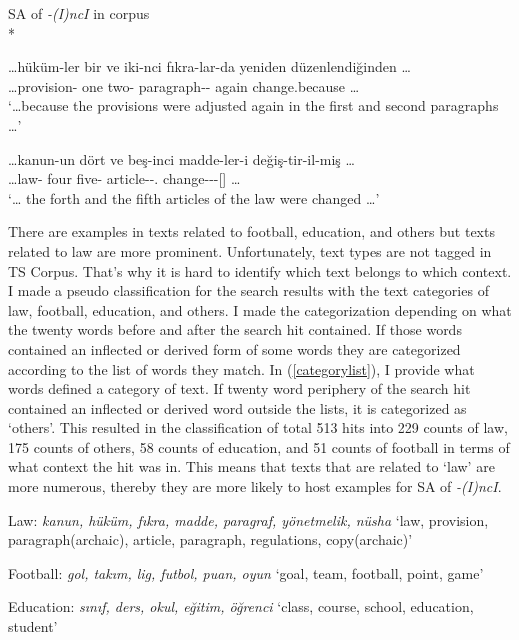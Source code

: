 \begin{exe}
\ex SA of \textit{-(I)ncI} in corpus\\*
\label{corpusquerry}
\begin{xlist}

\ex \gll \ldots hüküm-ler bir ve iki-nci fıkra-lar-da yeniden düzenlendiğinden \ldots \\
\ldots provision-{\Pl} one {\And} two-{\Der} paragraph-{\Pl}-{\Loc} again change.because \ldots \\
\glt `\ldots because the provisions were adjusted again in the first and second paragraphs \ldots'

\ex \gll \ldots kanun-un dört ve beş-inci madde-ler-i değiş-tir-il-miş \ldots \\
\ldots law-{\Gen} four {\And} five-{\Der} article-{\Pl}-{\Poss}.{\Tsg} change-{\Caus}-{\Pass}-{\Prf}[{\Tsg}] \ldots \\
\glt`{\ldots} the forth and the fifth articles of the law were changed {\ldots}'

\end{xlist}
\end{exe}

There are examples in texts related to football, education, and others but texts related to law are more prominent. Unfortunately, text types are not tagged in TS Corpus. That's why it is hard to identify which text belongs to which context. I made a pseudo classification for the search results with the text categories of law, football, education, and others. I made the categorization depending on what the twenty words before and after the search hit contained. If those words contained an inflected or derived form of some words they are categorized according to the list of words they match. In (\ref{categorylist}), I provide what words defined a category of text. If twenty word periphery of the search hit contained an inflected or derived word outside the lists, it is categorized as `others'. This resulted in the classification of total 513 hits into 229 counts of law, 175 counts of others, 58 counts of education, and 51 counts of football in terms of what context the hit was in. This means that texts that are related to `law' are more numerous, thereby they are more likely to host examples for SA of \textit{-(I)ncI}.

\begin{exe}
\ex \label{categorylist}
\begin{xlist}
\ex Law: \textit{kanun, hüküm, fıkra, madde, paragraf, yönetmelik, nüsha}
\glt `law, provision, paragraph(archaic), article, paragraph, regulations, copy(archaic)'

\ex Football: \textit{gol, takım, lig, futbol, puan, oyun}
\glt `goal, team, football, point, game'

\ex Education: \textit{sınıf, ders, okul, eğitim, öğrenci}
\glt `class, course, school, education, student'

\end{xlist}
\end{exe}


